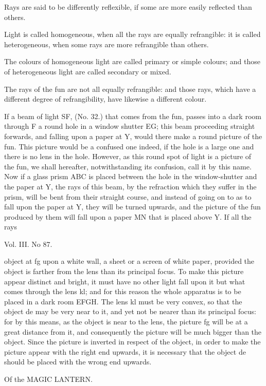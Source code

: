\documentclass{article}
\begin{document}
Rays are said to be differently reflexible, if some are more easily reflected than others.

Light is called homogeneous, when all the rays are equally refrangible: it is called heterogeneous, when some rays are more refrangible than others.

The colours of homogeneous light are called primary or simple colours; and those of heterogeneous light are called secondary or mixed.

The rays of the fun are not all equally refrangible: and those rays, which have a different degree of refrangibility, have likewise a different colour.

If a beam of light SF, (No. 32.) that comes from the fun, passes into a dark room through F a round hole in a window shutter EG; this beam proceeding straight forwards, and falling upon a paper at Y, would there make a round picture of the fun. This picture would be a confused one indeed, if the hole is a large one and there is no lens in the hole. However, as this round spot of light is a picture of the fun, we shall hereafter, notwithstanding its confusion, call it by this name. Now if a glass prism ABC is placed between the hole in the window-shutter and the paper at Y, the rays of this beam, by the refraction which they suffer in the prism, will be bent from their straight course, and instead of going on to as to fall upon the paper at Y, they will be turned upwards, and the picture of the fun produced by them will fall upon a paper MN that is placed above Y. If all the rays

Vol. III. No 87.

object at fg upon a white wall, a sheet or a screen of white paper, provided the object is farther from the lens than its principal focus. To make this picture appear distinct and bright, it must have no other light fall upon it but what comes through the lens kl; and for this reason the whole apparatus is to be placed in a dark room EFGH. The lens kl must be very convex, so that the object de may be very near to it, and yet not be nearer than its principal focus: for by this means, as the object is near to the lens, the picture fg will be at a great distance from it, and consequently the picture will be much bigger than the object. Since the picture is inverted in respect of the object, in order to make the picture appear with the right end upwards, it is necessary that the object de should be placed with the wrong end upwards.

Of the MAGIC LANTERN.
\end{document}

